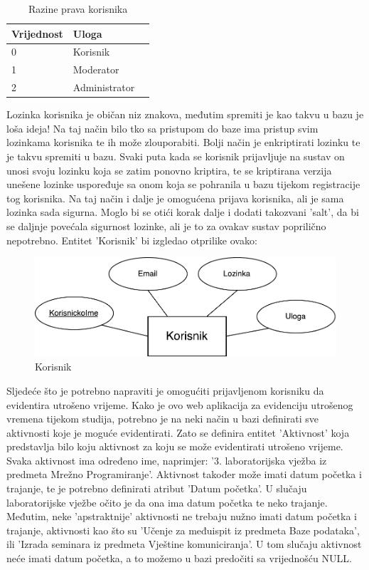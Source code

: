 \documentclass[times, utf8, zavrsni]{fer}
\begin{document}
\begin{table}[H]
\caption{Razine prava korisnika}
\label{tbl:razine_prava}
\centering
\begin{tabular}{llr} \hline
Vrijednost & Uloga\\ \hline
0 & Korisnik \\
1 & Moderator \\
2 & Administrator \\ \hline
\end{tabular}
\end{table}

Lozinka korisnika je običan niz znakova, međutim spremiti je kao takvu u bazu je loša ideja! Na taj način bilo tko sa pristupom do baze ima pristup svim lozinkama korisnika te ih može zlouporabiti. Bolji način je enkriptirati lozinku te je takvu spremiti u bazu. Svaki puta kada se korisnik prijavljuje na sustav on unosi svoju lozinku koja se zatim ponovno kriptira, te se kriptirana verzija unešene lozinke uspoređuje sa onom koja se pohranila u bazu tijekom registracije tog korisnika. Na taj način i dalje je omogućena prijava korisnika, ali je sama lozinka sada sigurna. Moglo bi se otići korak dalje i dodati takozvani 'salt', da bi se daljnje povećala sigurnost lozinke, ali je to za ovakav sustav poprilično nepotrebno. Entitet 'Korisnik' bi izgledao otprilike ovako:

\begin{figure}[H]
\centering
\includegraphics[width=\textwidth,height=\textheight,keepaspectratio]{img/korisnik.pdf}
\caption{Korisnik}
\label{fig:korisnik}
\end{figure}

Sljedeće što je potrebno napraviti je omogućiti prijavljenom korisniku da evidentira utrošeno vrijeme. Kako je ovo web aplikacija za evidenciju utrošenog vremena tijekom studija, potrebno je na neki način u bazi definirati sve aktivnosti koje je moguće evidentirati. Zato se definira entitet 'Aktivnost' koja predstavlja bilo koju aktivnost za koju se može evidentirati utrošeno vrijeme.
Svaka aktivnost ima određeno ime, naprimjer: '3. laboratorijska vježba iz predmeta Mrežno Programiranje'. Aktivnost također može imati datum početka i trajanje, te je potrebno definirati atribut 'Datum početka'. U slučaju laboratorijske vježbe očito je da ona ima datum početka te neko trajanje. Međutim, neke 'apstraktnije' aktivnosti ne trebaju nužno imati datum početka i trajanje, aktivnosti kao što su 'Učenje za međuispit iz predmeta Baze podataka', ili 'Izrada seminara iz predmeta Vještine komuniciranja'. U tom slučaju aktivnost neće imati datum početka, a to možemo u bazi predočiti sa vrijednošću NULL.
\end{document}
